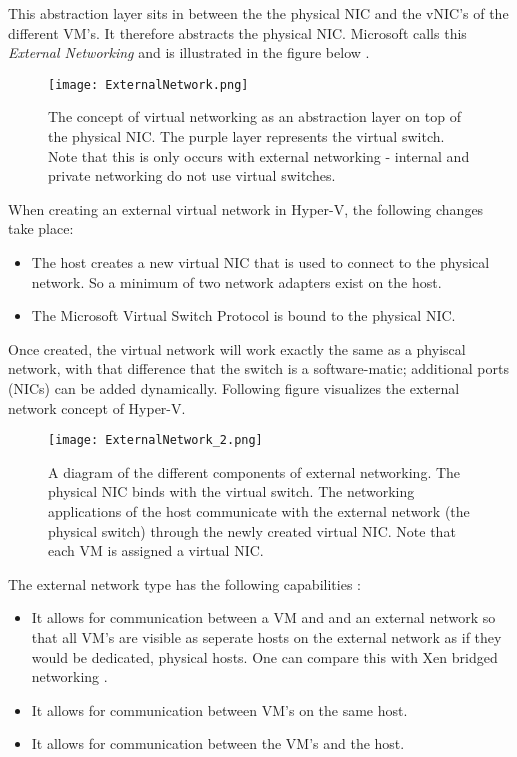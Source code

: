This abstraction layer sits in between the the physical NIC and the vNIC's of the different VM's. It therefore abstracts the physical NIC. Microsoft calls this \emph{External Networking} \citep{HyperVNetworking2} and is illustrated in the figure below \citep{HyperVNetworking1}.\\
\begin{figure}[h]
    \centering
    \texttt{[image: ExternalNetwork.png]}
    \caption[Microsoft Virtual Switch concept]{The concept of virtual networking as an abstraction layer on top of the physical NIC. The purple layer represents the virtual switch. Note that this is only occurs with external networking - internal and private networking do not use virtual switches.}
\end{figure}
When creating an external virtual network in Hyper-V, the following changes take place:
\begin{itemize}
\item The host creates a new virtual NIC that is used to connect to the physical network. So a minimum of two network adapters exist on the host.
\item The Microsoft Virtual Switch Protocol is bound to the physical NIC.
\end{itemize}
Once created, the virtual network will work exactly the same as a phyiscal network, with that difference that the switch is a software-matic; additional ports (NICs) can be added dynamically.
Following figure visualizes the external network concept of Hyper-V.
\begin{figure}[h]
    \centering
    \texttt{[image: ExternalNetwork\_2.png]}
    \caption[External Virtual Network]{A diagram of the different components of external networking. The physical NIC binds with the virtual switch. The networking applications of the host communicate with the external network (the physical switch) through the newly created virtual NIC. Note that each VM is assigned a virtual NIC.}
\end{figure}
The external network type has the following capabilities \citep{HyperVNetworking3}:
\begin{itemize}
\item It allows for communication between a VM and and an external network so that all VM's are visible as seperate hosts on the external network  as if they would be dedicated, physical hosts. One can compare this with Xen bridged networking \citep{XenNetworking}.
\item It allows for communication between VM's on the same host.
\item It allows for communication between the VM's and the host.
\end{itemize}

